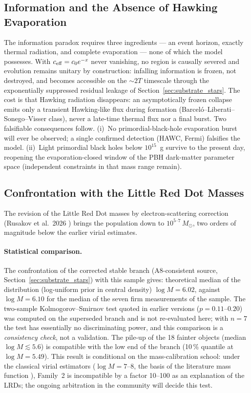 \documentclass[11pt,a4paper]{article}
\theoremstyle{plain}
\theoremstyle{remark}
\begin{document}
\subsection{Information and the Absence of Hawking Evaporation}
The information paradox requires three ingredients --- an event horizon, exactly thermal radiation, and complete evaporation --- none of which the model possesses. With $c_{\rm eff} = c_0 e^{-x}$ never vanishing, no region is causally severed and evolution remains unitary by construction: infalling information is frozen, not destroyed, and becomes accessible on the $\sim 2T$ timescale through the exponentially suppressed residual leakage of Section~\ref{sec:substrate_stars}. The cost is that Hawking radiation disappears: an asymptotically frozen collapse emits only a transient Hawking-like flux during formation (Barcel\'o--Liberati--Sonego--Visser class), never a late-time thermal flux nor a final burst. Two falsifiable consequences follow. (i)~No primordial-black-hole evaporation burst will ever be observed; a single confirmed detection (HAWC, Fermi) falsifies the model. (ii)~Light primordial black holes below $10^{15}$~g survive to the present day, reopening the evaporation-closed window of the PBH dark-matter parameter space (independent constraints in that mass range remain).

\subsection{Confrontation with the Little Red Dot Masses}
\label{sec:lrd}
The revision of the Little Red Dot masses by electron-scattering correction (Rusakov et al.\ 2026 \cite{rusakov2026}) brings the population down to $10^{5\text{--}7}\,M_\odot$, two orders of magnitude below the earlier virial estimates.

\paragraph{Statistical comparison.} The confrontation of the corrected stable branch (A8-consistent source, Section~\ref{sec:substrate_stars}) with this sample gives: theoretical median of the distribution (log-uniform prior in central density) $\log M = 6.02$, against $\log M = 6.10$ for the median of the seven firm measurements of the sample. The two-sample Kolmogorov--Smirnov test quoted in earlier versions ($p = 0.11$--$0.20$) was computed on the superseded branch and is not re-evaluated here; with $n = 7$ the test has essentially no discriminating power, and this comparison is a \emph{consistency check}, not a validation. The pile-up of the 18 fainter objects (median $\log M \lesssim 5.6$) is compatible with the low end of the branch (10\,\% quantile at $\log M = 5.49$). This result is conditional on the mass-calibration school: under the classical virial estimators ($\log M = 7$--$8$, the basis of the literature mass function \cite{jeon2026}), Family~2 is incompatible by a factor 10--100 as an explanation of the LRDs; the ongoing arbitration in the community will decide this test.
\end{document}
